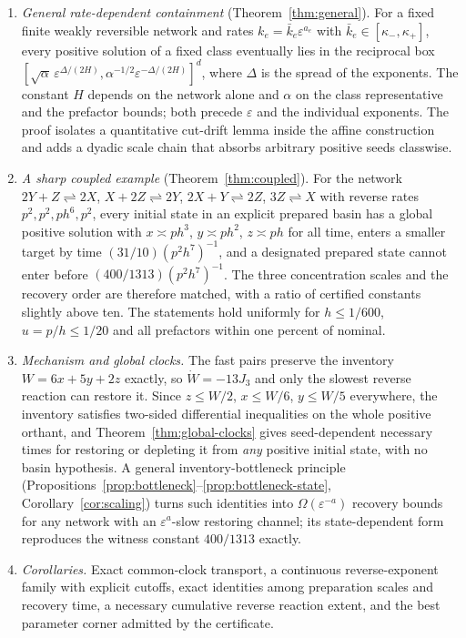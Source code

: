 \documentclass[11pt,a4paper]{article}
\theoremstyle{plain}
\theoremstyle{definition}
\theoremstyle{remark}
\newcommand{\eps}{\varepsilon}
\begin{document}
\begin{enumerate}[label=(\roman*)]
\item \emph{General rate-dependent containment} (Theorem~\ref{thm:general}). For a fixed finite weakly reversible network and rates $k_e=\bar k_e\eps^{a_e}$ with $\bar k_e\in[\kappa_-,\kappa_+]$, every positive solution of a fixed class eventually lies in the reciprocal box $[\sqrt\alpha\,\eps^{\Delta/(2H)},\alpha^{-1/2}\eps^{-\Delta/(2H)}]^d$, where $\Delta$ is the spread of the exponents. The constant $H$ depends on the network alone and $\alpha$ on the class representative and the prefactor bounds; both precede $\eps$ and the individual exponents. The proof isolates a quantitative cut-drift lemma inside the affine construction and adds a dyadic scale chain that absorbs arbitrary positive seeds classwise.
\item \emph{A sharp coupled example} (Theorem~\ref{thm:coupled}). For the network $2Y+Z\rightleftharpoons2X$, $X+2Z\rightleftharpoons2Y$, $2X+Y\rightleftharpoons2Z$, $3Z\rightleftharpoons X$ with reverse rates $p^2,p^2,ph^6,p^2$, every initial state in an explicit prepared basin has a global positive solution with $x\asymp ph^3$, $y\asymp ph^2$, $z\asymp ph$ for all time, enters a smaller target by time $(31/10)(p^2h^7)^{-1}$, and a designated prepared state cannot enter before $(400/1313)(p^2h^7)^{-1}$. The three concentration scales and the recovery order are therefore matched, with a ratio of certified constants slightly above ten. The statements hold uniformly for $h\le1/600$, $u=p/h\le1/20$ and all prefactors within one percent of nominal.
\item \emph{Mechanism and global clocks.} The fast pairs preserve the inventory $W=6x+5y+2z$ exactly, so $\dot W=-13J_3$ and only the slowest reverse reaction can restore it. Since $z\le W/2$, $x\le W/6$, $y\le W/5$ everywhere, the inventory satisfies two-sided differential inequalities on the whole positive orthant, and Theorem~\ref{thm:global-clocks} gives seed-dependent necessary times for restoring or depleting it from \emph{any} positive initial state, with no basin hypothesis. A general inventory-bottleneck principle (Propositions~\ref{prop:bottleneck}--\ref{prop:bottleneck-state}, Corollary~\ref{cor:scaling}) turns such identities into $\Omega(\eps^{-a})$ recovery bounds for any network with an $\eps^a$-slow restoring channel; its state-dependent form reproduces the witness constant $400/1313$ exactly.
\item \emph{Corollaries.} Exact common-clock transport, a continuous reverse-exponent family with explicit cutoffs, exact identities among preparation scales and recovery time, a necessary cumulative reverse reaction extent, and the best parameter corner admitted by the certificate.

\end{enumerate}
\end{document}
